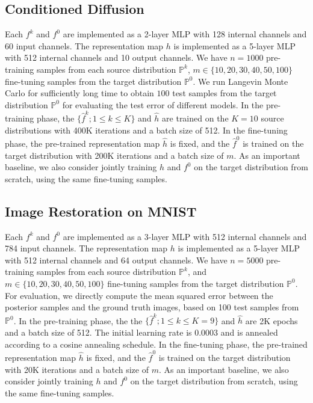 \documentclass{article}
\numberwithin{equation}{section}
\theoremstyle{definition}
\begin{document}
\subsection{Conditioned Diffusion}\label{app:sec:exp}
Each $f^k$ and $f^0$ are implemented as a 2-layer MLP with 128 internal channels and 60 input channels. 
The representation map $h$ is implemented as a 5-layer MLP with 512 internal channels and 10 output channels.
We have $n=1000$ pre-training samples from each source distribution $\mathbb{P}^k$, $m\in\{10,20,30, 40,50,100\}$ fine-tuning samples from the target distribution $\mathbb{P}^0$. 
We run Langevin Monte Carlo for sufficiently long time to obtain $100$ test samples from the target distribution $\mathbb{P}^0$ for evaluating the test error of different models.
In the pre-training phase, the $\{\widehat{f}^k; 1\leq k\leq K\}$ and $\hat{h}$ are trained on the $K=10$ source distributions with 400K iterations and a batch size of 512.
In the fine-tuning phase, the pre-trained representation map $\widehat{h}$ is fixed, and the $\widehat{f}^0$ is trained on the target distribution with 200K iterations and a batch size of $m$.
As an important baseline, we also consider jointly training $h$ and $f^{0}$ on the target distribution from scratch, using the same fine-tuning samples.

\subsection{Image Restoration on MNIST}\label{app:sec:exp-mnist}
Each $f^k$ and $f^0$ are implemented as a 3-layer MLP with 512 internal channels and 784 input channels.
The representation map $h$ is implemented as a 5-layer MLP with 512 internal channels and 64 output channels.
We have $n=5000$ pre-training samples from each source distribution $\mathbb{P}^k$, and $m\in\{10,20,30, 40,50,100\}$ fine-tuning samples from the target distribution $\mathbb{P}^0$.
For evaluation, we directly compute the mean squared error between the posterior samples and the ground truth images, based on 100 test samples from $\mathbb{P}^0$.
In the pre-training phase, the the $\{\widehat{f}^k; 1\leq k\leq K=9\}$ and $\hat{h}$ are 2K epochs and a batch size of 512.
The initial learning rate is 0.0003 and is annealed according to a cosine annealing schedule.
In the fine-tuning phase, the pre-trained representation map $\widehat{h}$ is fixed, and the $\widehat{f}^0$ is trained on the target distribution with 20K iterations and a batch size of $m$.
As an important baseline, we also consider jointly training $h$ and $f^{0}$ on the target distribution from scratch, using the same fine-tuning samples.
\end{document}
